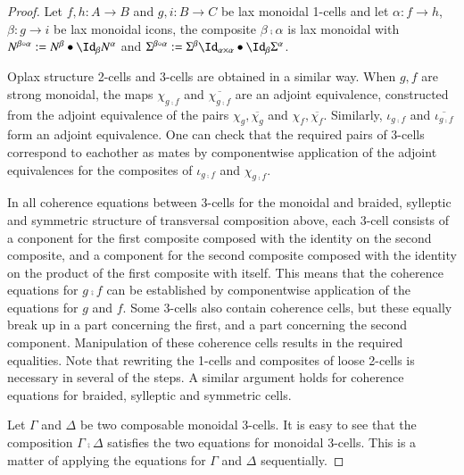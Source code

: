 \begin{proof}
Let $f,h: A \rightarrow B $ and $g,i: B \rightarrow C$ be lax monoidal 1-cells and let $\alpha: f \rightarrow h$, $\beta: g \rightarrow i$ be lax monoidal icons, the composite $\beta \comp \alpha$ is lax monoidal with $N^{\beta \comp \alpha}:= N^{\beta} \horc \looseid_{\beta} N^{\alpha}$ and $\Sigma^{\beta \comp \alpha}:= \Sigma^{\beta}\looseid_{\alpha \times \alpha} \horc \looseid_{\beta} \Sigma^{\alpha}$.

Oplax structure 2-cells and 3-cells are obtained in a similar way. When $g,f$ are strong monoidal, the maps $\chi_{g \comp f}$ and $\overline{\chi_{g \comp f}}$ are an adjoint equivalence, constructed from the adjoint equivalence of the pairs $\chi_g, \overline{\chi_g}$ and $\chi_f, \overline{\chi_f}$. Similarly, $\iota_{g \comp f}$ and $\overline{\iota_{g \comp f}}$ form an adjoint equivalence. One can check that the required pairs of 3-cells correspond to eachother as mates by componentwise application of the adjoint equivalences for the composites of $\iota_{g \comp f}$ and $\chi_{g \comp f}$.

In all coherence equations between 3-cells for the monoidal and braided, sylleptic and symmetric structure of transversal composition above, each 3-cell consists of a conponent for the first composite  composed with the identity on the second composite, and a component for the second composite composed with the identity on the product of the first composite with itself. This means that the coherence equations for $g \comp f$  can be established by componentwise application of the equations for $g$ and $f$. Some 3-cells also contain coherence cells, but these equally break up in a part concerning the first, and a part concerning the second component. Manipulation of these coherence cells results in the required equalities. Note that rewriting the 1-cells and composites of loose 2-cells is necessary in several of the steps. A similar argument holds for coherence equations for braided, sylleptic and symmetric cells.

Let $\Gamma$ and $\Delta$ be two composable monoidal 3-cells. It is easy to see that the composition $\Gamma \comp \Delta$ satisfies the two equations for monoidal 3-cells. This is a matter of applying the equations for $\Gamma$ and $\Delta$ sequentially.
\end{proof}

